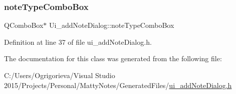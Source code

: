 \subsubsection{\texorpdfstring{note\+Type\+Combo\+Box}{noteTypeComboBox}}
{\footnotesize\ttfamily Q\+Combo\+Box$\ast$ Ui\+\_\+add\+Note\+Dialog\+::note\+Type\+Combo\+Box}



Definition at line 37 of file ui\+\_\+add\+Note\+Dialog.\+h.



The documentation for this class was generated from the following file\+:\begin{DoxyCompactItemize}
\item 
C\+:/\+Users/\+Ogrigorieva/\+Visual Studio 2015/\+Projects/\+Personal/\+Matty\+Notes/\+Generated\+Files/\hyperlink{ui__addNoteDialog_8h}{ui\+\_\+add\+Note\+Dialog.\+h}\end{DoxyCompactItemize}
